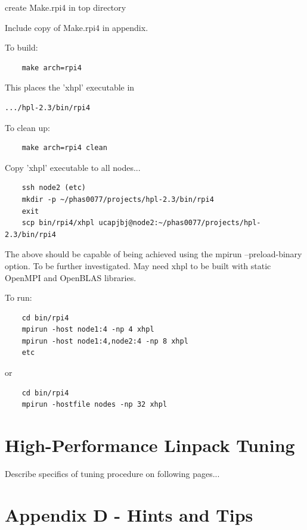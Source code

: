 \documentclass{article}
\begin{document}
create Make.rpi4 in top directory

Include copy of Make.rpi4 in appendix.

To build:

\begin{verbatim}
    make arch=rpi4    
\end{verbatim}

This places the 'xhpl' executable in 

\begin{verbatim}
.../hpl-2.3/bin/rpi4
\end{verbatim}

To clean up:

\begin{verbatim}
    make arch=rpi4 clean
\end{verbatim}

Copy 'xhpl' executable to all nodes...

\begin{verbatim}
    ssh node2 (etc)
    mkdir -p ~/phas0077/projects/hpl-2.3/bin/rpi4
    exit
    scp bin/rpi4/xhpl ucapjbj@node2:~/phas0077/projects/hpl-2.3/bin/rpi4
\end{verbatim}

The above should be capable of being achieved using the mpirun --preload-binary option. To be further investigated. May need xhpl to be built with static OpenMPI and OpenBLAS libraries.

To run:

\begin{verbatim}
    cd bin/rpi4
    mpirun -host node1:4 -np 4 xhpl
    mpirun -host node1:4,node2:4 -np 8 xhpl
    etc
\end{verbatim}

or

\begin{verbatim}
    cd bin/rpi4
    mpirun -hostfile nodes -np 32 xhpl
\end{verbatim}

%


\clearpage\section{High-Performance Linpack Tuning}
Describe specifics of tuning procedure on following pages...
%

%
%
\clearpage\section{Appendix D - Hints and Tips}
\end{document}
